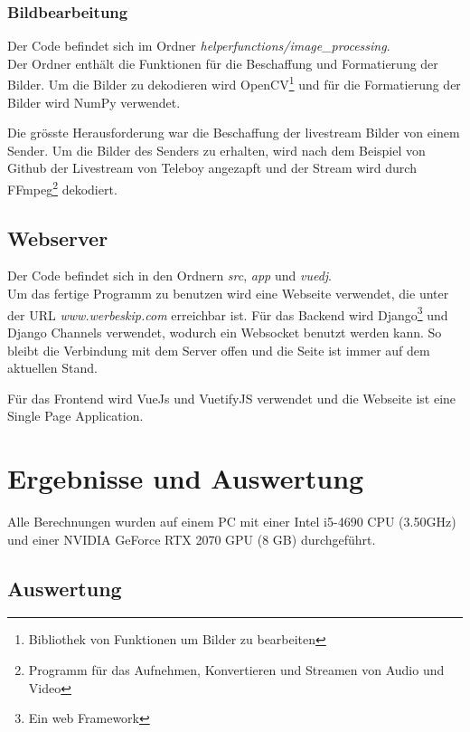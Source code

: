 \documentclass[12pt,a4paper]{report}
\begin{document}
\subsection{Bildbearbeitung}
Der Code befindet sich im Ordner \textit{helperfunctions/image\_processing}.\bigskip\\
Der Ordner enthält die Funktionen für die Beschaffung und Formatierung der Bilder.
Um die Bilder zu dekodieren wird OpenCV\cite{opencv_library}\footnote{Bibliothek von Funktionen um Bilder zu bearbeiten} und
für die Formatierung der Bilder wird NumPy verwendet.

Die grösste Herausforderung war die Beschaffung der livestream Bilder von einem Sender.
Um die Bilder des Senders zu erhalten, wird nach dem Beispiel von Github\cite{gittele} der Livestream von Teleboy angezapft und
der Stream wird durch FFmpeg\footnote{Programm für das Aufnehmen, Konvertieren und Streamen von Audio und Video} dekodiert.

\section{Webserver}
Der Code befindet sich in den Ordnern \textit{src}, \textit{app} und \textit{vuedj}.\bigskip\\
Um das fertige Programm zu benutzen wird eine Webseite verwendet, die unter der URL \textit{www.werbeskip.com} erreichbar ist.
Für das Backend wird Django\cite{django}\footnote{Ein web Framework} und Django Channels\cite{django_channel} verwendet, wodurch ein Websocket benutzt werden kann.
So bleibt die Verbindung mit dem Server offen und die Seite ist immer auf dem aktuellen Stand.

Für das Frontend wird VueJs\cite{vuejs} und VuetifyJS\cite{vuetify} verwendet und die Webseite ist eine Single Page Application.

\chapter{Ergebnisse und Auswertung}\label{ch:ergebnisseUndAuswertung}
Alle Berechnungen wurden auf einem PC mit einer Intel i5-4690 CPU (3.50GHz) und einer NVIDIA GeForce RTX 2070 GPU (8 GB) durchgeführt.
\section{Auswertung}
\end{document}
